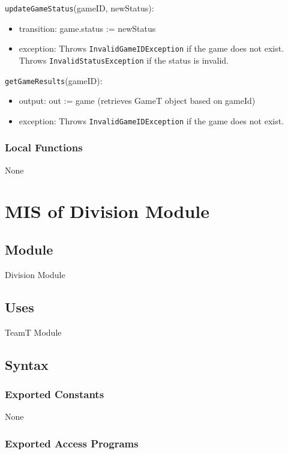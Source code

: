 \documentclass[12pt, titlepage]{article}
\begin{document}
\noindent \texttt{updateGameStatus}(gameID, newStatus):
\begin{itemize}
  \item transition: game.status := newStatus
  \item exception: Throws \texttt{InvalidGameIDException} if the game does not exist. Throws \texttt{InvalidStatusException} if the status is invalid.
\end{itemize}

\noindent \texttt{getGameResults}(gameID):
\begin{itemize}
  \item output: out := game (retrieves GameT object based on gameId)
  \item exception: Throws \texttt{InvalidGameIDException} if the game does not exist.
\end{itemize}

\subsubsection{Local Functions}
None

\newpage

\section{MIS of Division Module} \label{Division}

\subsection{Module}

Division Module

\subsection{Uses}
TeamT Module

\subsection{Syntax}

\subsubsection{Exported Constants}
None

\subsubsection{Exported Access Programs}
\end{document}
